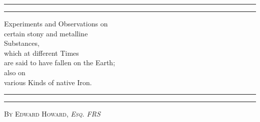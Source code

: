 \documentclass[a4paper, 12pt, oneside, twocolumn]{article}
\begin{document}
\begin{titlepage} %
	\centering %
	\scshape %

	
	\rule{0.8\textwidth}{1.6pt}\vspace*{-\baselineskip}\vspace*{2pt} %
	\rule{0.8\textwidth}{0.4pt} %
	
	\vspace{0.75\baselineskip} %

        {\LARGE Experiments and Observations on\\ certain stony and metalline\\ Substances,\\ which at different Times\\ are said to have fallen on the Earth;\\ also on\\ various Kinds of native Iron.} %
	
	\vspace{0.75\baselineskip} %
	
	\rule{0.8\textwidth}{0.4pt}\vspace*{-\baselineskip}\vspace{3.2pt} %
	\rule{0.8\textwidth}{1.6pt} %
	
	\vspace{1\baselineskip} %
	
	
	{\scshape\Large By Edward Howard, \emph{Esq. FRS}} %
	
	\vspace*{1\baselineskip} %
	

	\vspace{1\baselineskip} %

	

\end{titlepage}
\end{document}
